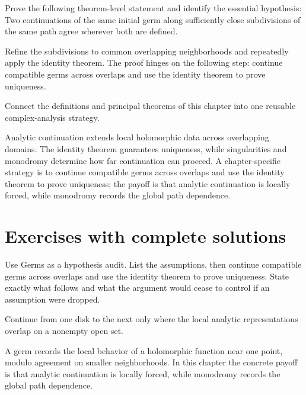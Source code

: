 \begin{problem}\label{prob:iv15-problem-11}
Prove the following theorem-level statement and identify the essential hypothesis: Two continuations of the same initial germ along sufficiently close subdivisions of the same path agree wherever both are defined.
\end{problem}
\begin{solution}
Refine the subdivisions to common overlapping neighborhoods and repeatedly apply the identity theorem. The proof hinges on the following step: continue compatible germs across overlaps and use the identity theorem to prove uniqueness.
\end{solution}

\begin{problem}\label{prob:iv15-problem-12}
Connect the definitions and principal theorems of this chapter into one reusable complex-analysis strategy.
\end{problem}
\begin{solution}
Analytic continuation extends local holomorphic data across overlapping domains. The identity theorem guarantees uniqueness, while singularities and monodromy determine how far continuation can proceed. A chapter-specific strategy is to continue compatible germs across overlaps and use the identity theorem to prove uniqueness; the payoff is that analytic continuation is locally forced, while monodromy records the global path dependence.
\end{solution}

\section{Exercises with complete solutions}

\begin{exercise}\label{exr:iv15-01}
Use Germs as a hypothesis audit. List the assumptions, then continue compatible germs across overlaps and use the identity theorem to prove uniqueness. State exactly what follows and what the argument would cease to control if an assumption were dropped.
\end{exercise}
\begin{hint}
Continue from one disk to the next only where the local analytic representations overlap on a nonempty open set.
\end{hint}
\begin{solution}
A germ records the local behavior of a holomorphic function near one point, modulo agreement on smaller neighborhoods. In this chapter the concrete payoff is that analytic continuation is locally forced, while monodromy records the global path dependence.
\end{solution}

